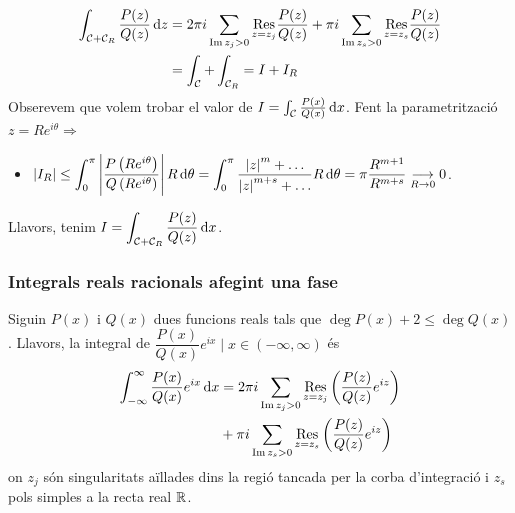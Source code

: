 \begin{sproof}
    \begin{align*}
    \begin{aligned}
        \int_{\mathcal{C} + \mathcal{C}_{R}} \frac{P(z)}{Q(z)} \mathop{}\!\mathrm{d} z &= 2\pi i \sum_{\operatorname{Im}z_{j} > 0} \underset{z=z_{j}}{\operatorname{Res}} \frac{P(z)}{Q(z)} + \pi i \sum_{\operatorname{Im}z_{s} > 0} \underset{z=z_{s}}{\operatorname{Res}} \frac{P(z)}{Q(z)} \\
        &= \int_{\mathcal{C}} + \int_{\mathcal{C}_{R}} = I + I_{R}
    \end{aligned}
    \end{align*}
    Obserevem que volem trobar el valor de $I =\int_{\mathcal{C}} \frac{P(x)}{Q(x)} \mathop{}\!\mathrm{d} x$. Fent la parametrització $z = R e^{i\theta} \Rightarrow$
    \begin{itemize}
        \item $\displaystyle \left| I_{R} \right| \leq \int_{0}^{\pi} \left| \frac{P\left( Re^{i\theta} \right)}{Q\left( Re^{i\theta} \right)} \right| R \mathop{}\!\mathrm{d} \theta = \int_{0}^{\pi} \frac{\left| z \right|^{m} + \dots }{\left| z \right|^{m+s} + \dots} R \mathop{}\!\mathrm{d} \theta = \pi \frac{R^{m+1}}{R^{m+s}} \underset{R \to 0}{\longrightarrow} 0$.
    \end{itemize}
    Llavors, tenim $\displaystyle I = \int_{\mathcal{C} + \mathcal{C}_{R}} \frac{P(z)}{Q(z)} \mathop{}\!\mathrm{d} x$.
\end{sproof}

\subsubsection*{Integrals reals racionals afegint una fase}
Siguin $P(x)$ i $Q(x)$ dues funcions reals tals que $\deg{P(x)} + 2 \leq \deg{Q(x)}$. Llavors, la integral de $\dfrac{P(x)}{Q(x)} e^{ix} \mid x \in (-\infty, \infty)$ és
\begin{align}
\begin{aligned}
    \int_{-\infty}^{\infty} \frac{P(x)}{Q(x)} e^{ix} \mathop{}\!\mathrm{d} x &= 2\pi i \sum_{\operatorname{Im}z_{j} > 0} \underset{z=z_{j}}{\operatorname{Res}} \left( \frac{P(z)}{Q(z)} e^{iz} \right) \\
    &+ \pi i \sum_{\operatorname{Im}z_{s} > 0} \underset{z=z_{s}}{\operatorname{Res}} \left( \frac{P(z)}{Q(z)} e^{iz} \right)
\end{aligned}
\end{align}
on $z_{j}$ són singularitats aïllades dins la regió tancada per la corba d'integració i $z_{s}$ pols simples a la recta real $\mathbb{R}$.

